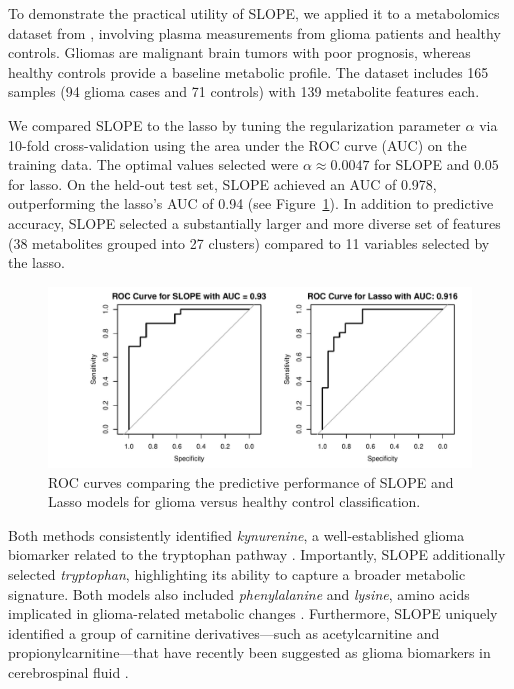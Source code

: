 \documentclass[article]{jss}
\begin{document}
To demonstrate the practical utility of SLOPE, we applied it to a metabolomics dataset from \citet{Godlewski2023}, involving plasma measurements from glioma patients and healthy controls. Gliomas are malignant brain tumors with poor prognosis, whereas healthy controls provide a baseline metabolic profile. The dataset includes 165 samples (94 glioma cases and 71 controls) with 139 metabolite features each.

We compared SLOPE to the lasso by tuning the regularization parameter $\alpha$ via 10-fold cross-validation using the area under the ROC curve (AUC) on the training data. The optimal values selected were  $\alpha \approx 0.0047$ for SLOPE and $0.05$ for lasso. On the held-out test set, SLOPE achieved an AUC of 0.978, outperforming the lasso’s AUC of 0.94 (see Figure~\ref{fig:roc-curve}). In addition to predictive accuracy, SLOPE selected a substantially larger and more diverse set of features (38 metabolites grouped into 27 clusters) compared to 11 variables selected by the lasso.
\begin{figure}[tp]
  \centering
  \includegraphics[width=\textwidth]{images/glioma-roc.pdf}
  \caption{ROC curves comparing the predictive performance of SLOPE and Lasso models for glioma versus healthy control classification.}
  \label{fig:roc-curve}
\end{figure}

Both methods consistently identified \textit{kynurenine}, a well-established glioma biomarker related to the tryptophan pathway \citep{du2020both}. Importantly, SLOPE additionally selected \textit{tryptophan}, highlighting its ability to capture a broader metabolic signature. Both models also included \textit{phenylalanine} and \textit{lysine}, amino acids implicated in glioma-related metabolic changes \citep{koslinski2023comparative, srivastava2025amino}. Furthermore, SLOPE uniquely identified a group of carnitine derivatives—such as acetylcarnitine and propionylcarnitine—that have recently been suggested as glioma biomarkers in cerebrospinal fluid \citep{wang2024genomic}.
\end{document}
